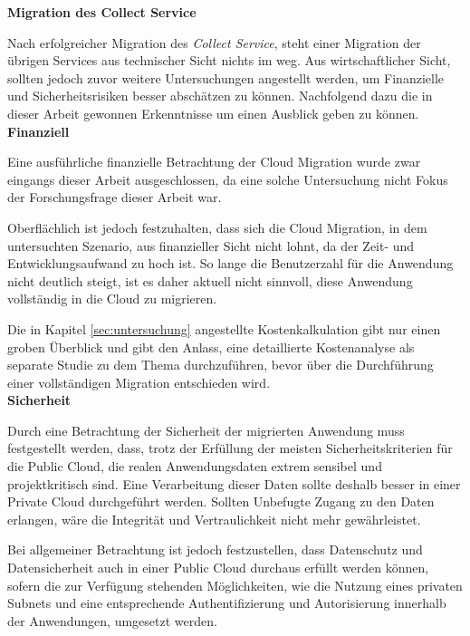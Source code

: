 \textbf{Migration des Collect Service}

Nach erfolgreicher Migration des \textit{Collect Service}, steht einer Migration der übrigen Services aus technischer Sicht nichts im weg. Aus wirtschaftlicher Sicht, sollten jedoch zuvor weitere Untersuchungen angestellt werden, um Finanzielle und Sicherheitsrisiken besser abschätzen zu können. Nachfolgend dazu die in dieser Arbeit gewonnen Erkenntnisse um einen Ausblick geben zu können. \\

\textbf{Finanziell}

Eine ausführliche finanzielle Betrachtung der Cloud Migration wurde zwar eingangs dieser Arbeit ausgeschlossen, da eine solche Untersuchung nicht Fokus der Forschungsfrage dieser Arbeit war.

Oberflächlich ist jedoch festzuhalten, dass sich die Cloud Migration, in dem untersuchten Szenario, aus finanzieller Sicht nicht lohnt, da der Zeit- und Entwicklungsaufwand zu hoch ist. So lange die Benutzerzahl für die Anwendung nicht deutlich steigt, ist es daher aktuell nicht sinnvoll, diese Anwendung vollständig in die Cloud zu migrieren.

Die in Kapitel \ref{sec:untersuchung} angestellte Kostenkalkulation gibt nur einen groben Überblick und gibt den Anlass, eine detaillierte Kostenanalyse als separate Studie zu dem Thema durchzuführen, bevor über die Durchführung einer vollständigen Migration entschieden wird. \\

\textbf{Sicherheit}

Durch eine Betrachtung der Sicherheit der migrierten Anwendung muss festgestellt werden, dass, trotz der Erfüllung der meisten Sicherheitskriterien für die Public Cloud, die realen Anwendungsdaten extrem sensibel und projektkritisch sind. Eine Verarbeitung dieser Daten sollte deshalb besser in einer Private Cloud durchgeführt werden. Sollten Unbefugte Zugang zu den Daten erlangen, wäre die Integrität und Vertraulichkeit nicht mehr gewährleistet.

Bei allgemeiner Betrachtung ist jedoch festzustellen, dass Datenschutz und Datensicherheit auch in einer Public Cloud durchaus erfüllt werden können, sofern die zur Verfügung stehenden Möglichkeiten, wie die Nutzung eines privaten Subnets und eine entsprechende Authentifizierung und Autorisierung innerhalb der Anwendungen, umgesetzt werden. \pagebreak

